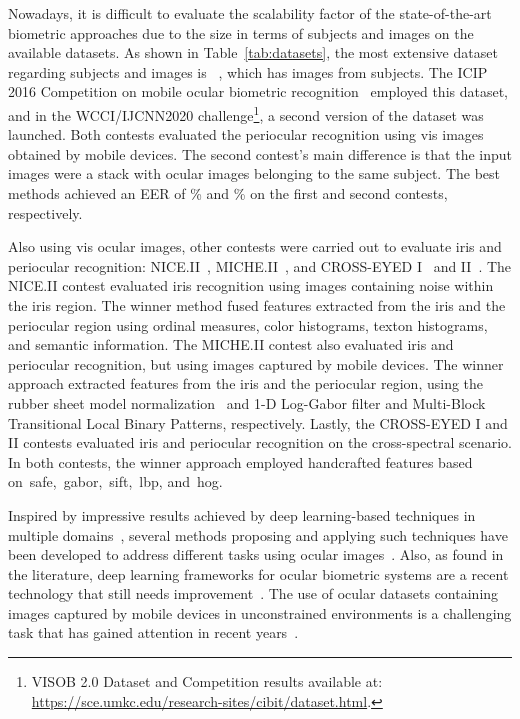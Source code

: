 \documentclass[journal]{IEEEtran}
\begin{document}
Nowadays, it is difficult to evaluate the scalability factor of the state-of-the-art biometric approaches due to the size in terms of subjects and images on the available datasets.
As shown in Table~\ref{tab:datasets}, the most extensive dataset regarding subjects and images is  \visob~\cite{Rattani2016}, which has  images from  subjects.
The ICIP 2016 Competition on mobile ocular biometric recognition~\cite{Rattani2016} employed this dataset, and in the WCCI/IJCNN2020 challenge\footnote{VISOB 2.0 Dataset and Competition results available at: \url{https://sce.umkc.edu/research-sites/cibit/dataset.html}.}, a second version of the dataset was launched.
Both contests evaluated the periocular recognition using \gls{vis} images obtained by mobile devices.
The second contest's main difference is that the input images were a stack with  ocular images belonging to the same subject.
The best methods achieved an EER of \% and \% on the first and second contests, respectively.

Also using \gls{vis} ocular images, other contests were carried out to evaluate iris and periocular recognition: NICE.II~\cite{Proenca2012}, MICHE.II~\cite{DeMarsico2017}, and CROSS-EYED I~\cite{Sequeira2016} and II~\cite{Sequeira2017}.
The NICE.II contest evaluated iris recognition using images containing noise within the iris region.
The winner method fused features extracted from the iris and the periocular region using ordinal measures, color histograms, texton histograms, and semantic information.
The MICHE.II contest also evaluated iris and periocular recognition, but using images captured by mobile devices.
The winner approach extracted features from the iris and the periocular region, using the rubber sheet model normalization~\cite{Daugman1993} and 1-D Log-Gabor filter and Multi-Block Transitional Local Binary Patterns, respectively.
Lastly, the CROSS-EYED I and II contests evaluated iris and periocular recognition on the cross-spectral scenario.
In both contests, the winner approach employed handcrafted features based on~\gls{safe},~\gls{gabor},~\gls{sift},~\gls{lbp}, and~\gls{hog}.

Inspired by impressive results achieved by deep learning-based techniques in multiple domains~\cite{lecun2015deep}, several methods proposing and applying such techniques have been developed to address different tasks using ocular images~\cite{Silva2015, lucio2019simultaneous, severo2018benchmark, lucio2018fully, bezerra2018robust, Menotti2015, He2016, Du2016, proenca2019inset, Zhao2019capsule, diaz2020spectrum, zanlorensi2020attnormalization, zanlorensi2018impact, zanlorensi2020deep, Luz2018, silva2018multimodal, hern2020crossspectral}.
Also, as found in the literature, deep learning frameworks for ocular biometric systems are a recent technology that still needs improvement~\cite{zanlorensi2019ocular}.
The use of ocular datasets containing images captured by mobile devices in unconstrained environments is a challenging task that has gained attention in recent years~\cite{DeMarsico2017, Rattani2016, reddy2018comparison, zanlorensi2019ocular, zanlorensi2020attnormalization}.
 
\end{document}
